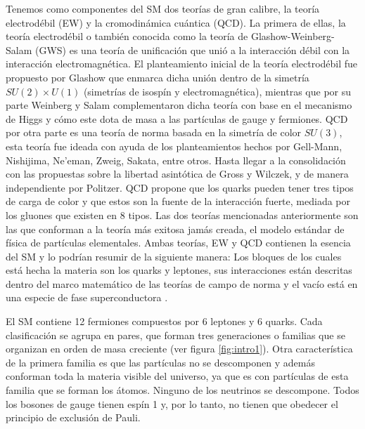 Tenemos como componentes del SM dos teorías de gran calibre, la teoría electrodébil (EW) y la cromodinámica cuántica (QCD). La primera de ellas, la teoría electrodébil o también conocida como la teoría de Glashow-Weinberg-Salam (GWS) es una teoría de unificación que unió a la interacción débil con la interacción electromagnética. El planteamiento inicial de la teoría electrodébil fue propuesto por Glashow que enmarca dicha unión dentro de la simetría \(SU(2)\times U(1)\) (simetrías de isospín y electromagnética), mientras que por su parte Weinberg y Salam complementaron dicha teoría con base en el mecanismo de Higgs y cómo este dota de masa a las partículas de gauge y fermiones. QCD por otra parte es una teoría de norma basada en la simetría de color \(SU(3)\), esta teoría fue ideada con ayuda de los planteamientos hechos por Gell-Mann, Nishijima, Ne'eman, Zweig, Sakata, entre otros. Hasta llegar a la consolidación con las propuestas sobre la libertad asintótica de Gross y Wilczek, y de manera independiente por Politzer. QCD propone que los quarks pueden tener tres tipos de carga de color y que estos son la fuente de la interacción fuerte, mediada por los gluones que existen en 8 tipos. Las dos teorías mencionadas anteriormente son las que conforman a la teoría más exitosa jamás creada, el modelo estándar de física de partículas elementales. 
Ambas teorías, EW y QCD contienen la esencia del SM y lo podrían resumir de la siguiente manera: Los bloques de los cuales está hecha la materia son los quarks y leptones, sus interacciones están descritas dentro del marco matemático de las teorías de campo de norma y el vacío está en una especie de fase superconductora \cite{nagashima2013elementary}.

El SM contiene 12 fermiones compuestos por 6 leptones y 6 quarks. Cada clasificación se agrupa en pares, que forman tres generaciones o familias que se organizan en orden de masa creciente (ver figura \ref{fig:intro1}). Otra característica de la primera familia es que las partículas no se descomponen y además conforman toda la materia visible del universo, ya que es con partículas de esta familia que se forman los átomos. Ninguno de los neutrinos se descompone. Todos los bosones de gauge tienen espín 1 y, por lo tanto, no tienen que obedecer el principio de exclusión de Pauli. 

